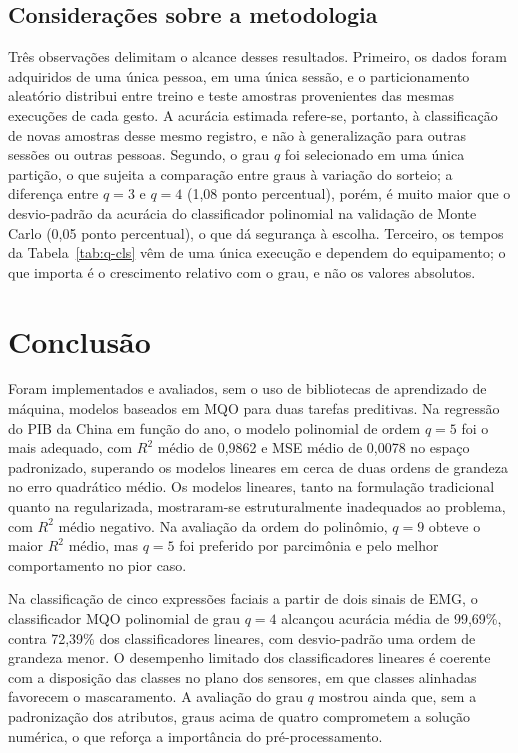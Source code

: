 \documentclass[conference]{IEEEtran}
\begin{document}
\subsection{Considerações sobre a metodologia}

Três observações delimitam o alcance desses resultados. Primeiro, os dados
foram adquiridos de uma única pessoa, em uma única sessão, e o particionamento
aleatório distribui entre treino e teste amostras provenientes das mesmas
execuções de cada gesto. A acurácia estimada refere-se, portanto, à
classificação de novas amostras desse mesmo registro, e não à generalização
para outras sessões ou outras pessoas. Segundo, o grau $q$ foi selecionado em
uma única partição, o que sujeita a comparação entre graus à variação do
sorteio; a diferença entre $q = 3$ e $q = 4$ (1,08 ponto percentual), porém, é
muito maior que o desvio-padrão da acurácia do classificador polinomial na
validação de Monte Carlo (0,05 ponto percentual), o que dá segurança à escolha.
Terceiro, os tempos da Tabela~\ref{tab:q-cls} vêm de uma única execução e
dependem do equipamento; o que importa é o crescimento relativo com o grau, e
não os valores absolutos.

\section{Conclusão}
\label{sec:conclusao}

Foram implementados e avaliados, sem o uso de bibliotecas de aprendizado de
máquina, modelos baseados em MQO para duas tarefas preditivas. Na regressão do
PIB da China em função do ano, o modelo polinomial de ordem $q = 5$ foi o mais
adequado, com $R^2$ médio de 0,9862 e MSE médio de 0,0078 no espaço
padronizado, superando os modelos lineares em cerca de duas ordens de grandeza
no erro quadrático médio. Os modelos lineares, tanto na formulação tradicional
quanto na regularizada, mostraram-se estruturalmente inadequados ao problema,
com $R^2$ médio negativo. Na avaliação da ordem do polinômio, $q = 9$ obteve o
maior $R^2$ médio, mas $q = 5$ foi preferido por parcimônia e pelo melhor
comportamento no pior caso.

Na classificação de cinco expressões faciais a partir de dois sinais de EMG, o
classificador MQO polinomial de grau $q = 4$ alcançou acurácia média de
99,69\%, contra 72,39\% dos classificadores lineares, com desvio-padrão uma
ordem de grandeza menor. O desempenho limitado dos classificadores lineares é
coerente com a disposição das classes no plano dos sensores, em que classes
alinhadas favorecem o mascaramento. A avaliação do grau $q$ mostrou ainda que,
sem a padronização dos atributos, graus acima de quatro comprometem a solução
numérica, o que reforça a importância do pré-processamento.
\end{document}
